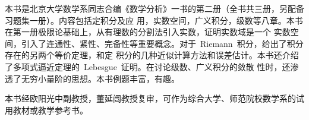 

\begin{summary}
本书是北京大学数学系同志合编《数学分析》一书的第二册（全书共三册，另配备习题集一册）。内容包括定积分及应
用，实数空间，广义积分，级数等八章。本书在第一册极限论基础上，从有理数的分割法引入实数，证明实数域是一个
实数空间，引入了连通性、紧性、完备性等重要概念。对于~Riemann~积分，给出了积分存在的另两个等价定理，和定
积分的几种近似计算方法和误差估计。本书还介绍了多项式逼近定理的~Lebesgue~证明。在讨论级数、广义积分的敛散
性时，还渗透了无穷小量阶的思想。本书例题丰富，有趣。

本书经欧阳光中副教授，董延闿教授复审，可作为综合大学、师范院校数学系的试用教材或教学参考书。
\end{summary}

\MakeVolume*

\volfrontmatter



\VolumeTOC

\volmainmatter











\endinput
